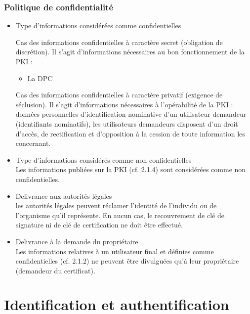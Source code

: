 \documentclass[a4paper,11pt,french]{book}
\begin{document}
\subsubsection{Politique de confidentialité}
\begin{itemize}
\item Type d'informations considérées comme confidentielles

Cas des informations confidentielles à caractère secret (obligation de discrétion). Il s’agit d’informations nécessaires au bon fonctionnement de la PKI :
\begin{itemize}

\item La DPC
\\
\end{itemize}



Cas des informations confidentielles à caractère privatif (exigence de séclusion). Il s’agit d’informations nécessaires à l’opérabilité de la PKI :
données personnelles d’identification nominative d’un utilisateur demandeur (identifiants nominatifs), les utilisateurs demandeurs disposent d'un droit d'accès, de rectification et d'opposition à la cession de toute information les concernant.
\\

\item Type d'informations considérés comme non confidentielles
\\Les informations publiées sur la PKI (cf. 2.1.4) sont considérées comme non confidentielles.
\\
\item Delivrance aux autorités légales
\\les autorités légales peuvent réclamer l’identité de l’individu ou de l’organisme qu’il représente. En aucun cas, le recouvrement de clé de signature ni de clé de certification ne doit être effectué.
\\

\item Delivrance à la demande du propriétaire
\\Les informations relatives à un utilisateur final et définies comme confidentielles (cf. 2.1.2) ne peuvent être divulguées qu’à leur propriétaire (demandeur du certificat).
\end{itemize}

\section{Identification et authentification}
\end{document}
